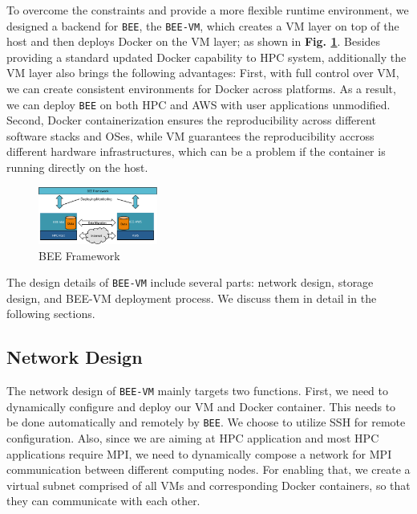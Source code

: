 To overcome the constraints and provide a more flexible runtime environment, we designed a backend for \texttt{BEE}, the \texttt{BEE-VM}, which creates a VM layer on top of the host and then deploys Docker on the VM layer; as shown in \textbf{Fig. \ref{bee-framework}}. Besides providing a standard updated Docker capability to HPC system, additionally the VM layer also brings the following advantages: First, with full control over VM, we can create consistent environments for Docker across platforms. As a result, we can deploy \texttt{BEE} on both HPC and AWS with user applications unmodified. Second, Docker containerization ensures the reproducibility across  different software stacks and OSes, while VM guarantees the reproducibility accross different hardware infrastructures, which can be a problem if the container is running directly on the host.  

\begin{figure}[h]
    \centering
    \includegraphics[width=0.35\textwidth]{figures/bee-framework.pdf}
    \caption{BEE Framework}
    \label{bee-framework}
\end{figure}


 The design details of \texttt{BEE-VM} include several parts: network design, storage design, and BEE-VM deployment process. We discuss them in detail in the following sections.
 
\subsection{Network Design}
The network design of \texttt{BEE-VM} mainly targets two functions. First, we need to dynamically configure and deploy our VM and Docker container. This needs to be done automatically and remotely by \texttt{BEE}. We choose to utilize SSH for remote configuration. Also, since we are aiming at HPC application and most HPC applications require MPI, we need to dynamically compose a network for MPI communication between different computing nodes. For enabling that, we create a virtual subnet comprised of all VMs and corresponding Docker containers, so that they can communicate with each other.

